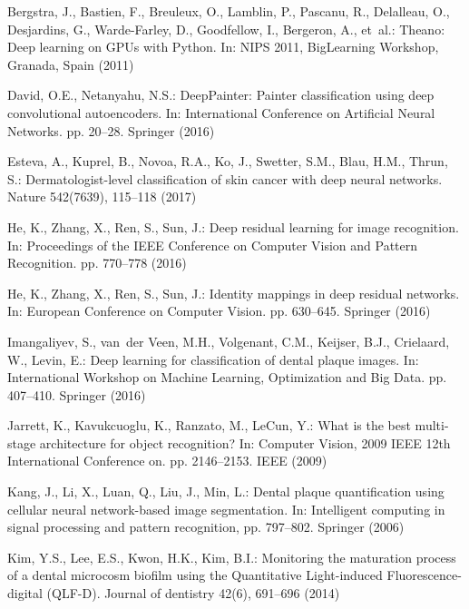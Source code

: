\documentclass[runningheads,a4paper]{llncs}
\begin{document}
%
%
\begin{thebibliography}{10}
\providecommand{\url}[1]{\texttt{#1}}
\providecommand{\urlprefix}{URL }

Bergstra, J., Bastien, F., Breuleux, O., Lamblin, P., Pascanu, R., Delalleau,
  O., Desjardins, G., Warde-Farley, D., Goodfellow, I., Bergeron, A., et~al.:
  Theano: Deep learning on {GPU}s with {P}ython. In: NIPS 2011, BigLearning
  Workshop, Granada, Spain (2011)

David, O.E., Netanyahu, N.S.: Deep{P}ainter: Painter classification using deep
  convolutional autoencoders. In: International Conference on Artificial Neural
  Networks. pp. 20--28. Springer (2016)

Esteva, A., Kuprel, B., Novoa, R.A., Ko, J., Swetter, S.M., Blau, H.M., Thrun,
  S.: Dermatologist-level classification of skin cancer with deep neural
  networks. Nature  542(7639),  115--118 (2017)

He, K., Zhang, X., Ren, S., Sun, J.: Deep residual learning for image
  recognition. In: Proceedings of the IEEE Conference on Computer Vision and
  Pattern Recognition. pp. 770--778 (2016)

He, K., Zhang, X., Ren, S., Sun, J.: Identity mappings in deep residual
  networks. In: European Conference on Computer Vision. pp. 630--645. Springer
  (2016)

Imangaliyev, S., van~der Veen, M.H., Volgenant, C.M., Keijser, B.J., Crielaard,
  W., Levin, E.: Deep learning for classification of dental plaque images. In:
  International Workshop on Machine Learning, Optimization and Big Data. pp.
  407--410. Springer (2016)

Jarrett, K., Kavukcuoglu, K., Ranzato, M., LeCun, Y.: What is the best
  multi-stage architecture for object recognition? In: Computer Vision, 2009
  IEEE 12th International Conference on. pp. 2146--2153. IEEE (2009)

Kang, J., Li, X., Luan, Q., Liu, J., Min, L.: Dental plaque quantification
  using cellular neural network-based image segmentation. In: Intelligent
  computing in signal processing and pattern recognition, pp. 797--802.
  Springer (2006)

Kim, Y.S., Lee, E.S., Kwon, H.K., Kim, B.I.: Monitoring the maturation process
  of a dental microcosm biofilm using the {Q}uantitative {L}ight-induced
  {F}luorescence-digital {(QLF-D)}. Journal of dentistry  42(6),  691--696
  (2014)


\end{thebibliography}
\end{document}
